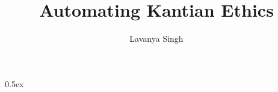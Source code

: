 \documentclass[11pt,a4paper]{article}
\begin{document}
\title{Automating Kantian Ethics}
\author{Lavanya Singh}
\maketitle

\tableofcontents

\newpage

\parindent 0pt\parskip 0.5ex











\newpage



\end{document}
